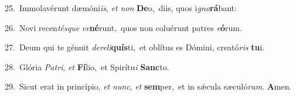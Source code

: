 {\numbfont\textcolor{\numbcolor}{25.}}~Immolavérunt dæmóni\-\textit{is}\-, \textit{et} \textit{non} \textbf{De}\-o,~\star diis, quos i\-\textit{gno}\-\textbf{rá}bant:\par
{\numbfont\textcolor{\numbcolor}{26.}}~Novi recen\-\textit{tés}\-\textit{que} \textit{ve}\-\textbf{né}runt,~\star quos non coluérunt patres \textit{e}\-\textbf{ó}rum.\par
{\numbfont\textcolor{\numbcolor}{27.}}~Deum qui te génuit \textit{de}\-\textit{re}\textit{li}\textbf{quís}ti,~\star et oblítus es Dómini, creató\textit{ris} \textbf{tu}\-i.\par
{\numbfont\textcolor{\numbcolor}{28.}}~Glória \textit{Pa}\-\textit{tri}, \textit{et} \textbf{Fí}\-lio,~\star et Spirítu\textit{i} \textbf{Sanc}\-to.\par
{\numbfont\textcolor{\numbcolor}{29.}}~Sicut erat in princípio, \textit{et} \textit{nunc}\-, \textit{et} \textbf{sem}\-per,~\star et in sǽcula sæculó\-\textit{rum}\-. \textbf{A}\-men.\par
